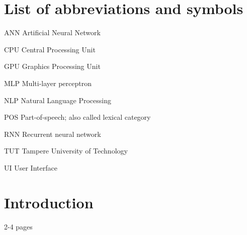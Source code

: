 \documentclass[12pt,a4paper,english
]{tutthesis}
\begin{document}
\setcounter{tocdepth}{3}              %
\tableofcontents                      %


%
%
\chapter*{List of abbreviations and symbols}
\markboth{}{}                                %

\begin{termlist}
\item[ANN] Artificial Neural Network
\item[CPU] Central Processing Unit
\item[GPU] Graphics Processing Unit
\item[MLP] Multi-layer perceptron
\item[NLP] Natural Language Processing
\item[POS] Part-of-speech; also called lexical category
\item[RNN] Recurrent neural network
\item[TUT] Tampere University of Technology
\item[UI] User Interface
\end{termlist}



\newpage

\if@twoside
\cleardoublepage
\fi

\setcounter{page}{1} %
\renewcommand{\chaptername}{} %


\chapter{Introduction}
\label{ch:intro}
2-4 pages
\end{document}
